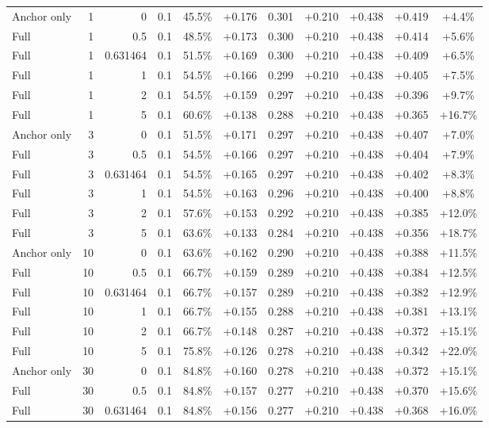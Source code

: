\begin{table}[htbp]
\begin{tabular}{lrrrccccccc}
Anchor only & 1 & 0 & 0.1 & 45.5\% & +0.176 & 0.301 & +0.210 & +0.438 & +0.419 & +4.4\% \\
Full & 1 & 0.5 & 0.1 & 48.5\% & +0.173 & 0.300 & +0.210 & +0.438 & +0.414 & +5.6\% \\
Full & 1 & 0.631464 & 0.1 & 51.5\% & +0.169 & 0.300 & +0.210 & +0.438 & +0.409 & +6.5\% \\
Full & 1 & 1 & 0.1 & 54.5\% & +0.166 & 0.299 & +0.210 & +0.438 & +0.405 & +7.5\% \\
Full & 1 & 2 & 0.1 & 54.5\% & +0.159 & 0.297 & +0.210 & +0.438 & +0.396 & +9.7\% \\
Full & 1 & 5 & 0.1 & 60.6\% & +0.138 & 0.288 & +0.210 & +0.438 & +0.365 & +16.7\% \\
Anchor only & 3 & 0 & 0.1 & 51.5\% & +0.171 & 0.297 & +0.210 & +0.438 & +0.407 & +7.0\% \\
Full & 3 & 0.5 & 0.1 & 54.5\% & +0.166 & 0.297 & +0.210 & +0.438 & +0.404 & +7.9\% \\
Full & 3 & 0.631464 & 0.1 & 54.5\% & +0.165 & 0.297 & +0.210 & +0.438 & +0.402 & +8.3\% \\
Full & 3 & 1 & 0.1 & 54.5\% & +0.163 & 0.296 & +0.210 & +0.438 & +0.400 & +8.8\% \\
Full & 3 & 2 & 0.1 & 57.6\% & +0.153 & 0.292 & +0.210 & +0.438 & +0.385 & +12.0\% \\
Full & 3 & 5 & 0.1 & 63.6\% & +0.133 & 0.284 & +0.210 & +0.438 & +0.356 & +18.7\% \\
Anchor only & 10 & 0 & 0.1 & 63.6\% & +0.162 & 0.290 & +0.210 & +0.438 & +0.388 & +11.5\% \\
Full & 10 & 0.5 & 0.1 & 66.7\% & +0.159 & 0.289 & +0.210 & +0.438 & +0.384 & +12.5\% \\
Full & 10 & 0.631464 & 0.1 & 66.7\% & +0.157 & 0.289 & +0.210 & +0.438 & +0.382 & +12.9\% \\
Full & 10 & 1 & 0.1 & 66.7\% & +0.155 & 0.288 & +0.210 & +0.438 & +0.381 & +13.1\% \\
Full & 10 & 2 & 0.1 & 66.7\% & +0.148 & 0.287 & +0.210 & +0.438 & +0.372 & +15.1\% \\
Full & 10 & 5 & 0.1 & 75.8\% & +0.126 & 0.278 & +0.210 & +0.438 & +0.342 & +22.0\% \\
Anchor only & 30 & 0 & 0.1 & 84.8\% & +0.160 & 0.278 & +0.210 & +0.438 & +0.372 & +15.1\% \\
Full & 30 & 0.5 & 0.1 & 84.8\% & +0.157 & 0.277 & +0.210 & +0.438 & +0.370 & +15.6\% \\
Full & 30 & 0.631464 & 0.1 & 84.8\% & +0.156 & 0.277 & +0.210 & +0.438 & +0.368 & +16.0\% \\

\end{tabular}
\end{table}
